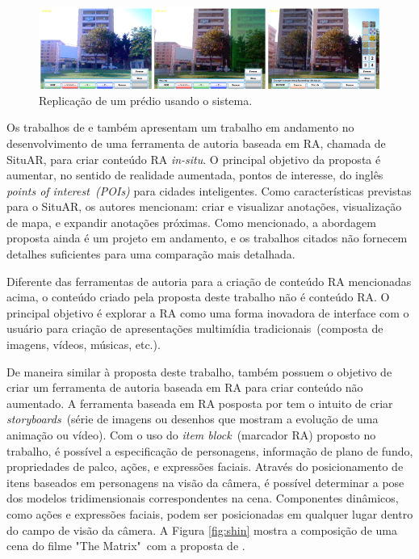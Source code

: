 \documentclass[../main.tex]{subfiles}
\begin{document}
\begin{figure}[!h]
\centering
\includegraphics[width=1\linewidth]{IMG/Relacionados/langlotz.png}
\caption{Replicação de um prédio usando o sistema.}
\label{fig:langlotz}
\end{figure}

Os trabalhos de  e  também apresentam um trabalho em andamento no desenvolvimento de uma ferramenta de autoria baseada em RA, chamada de SituAR, para criar conteúdo RA \emph{in-situ}. O principal objetivo da proposta é aumentar, no sentido de realidade aumentada, pontos de interesse, do inglês \emph{points of interest~(POIs)} para cidades inteligentes. Como características previstas para o SituAR, os autores mencionam: criar e visualizar anotações, visualização de mapa, e expandir anotações próximas. Como mencionado, a abordagem proposta ainda é um projeto em andamento, e os trabalhos citados não fornecem detalhes suficientes para uma comparação mais detalhada.

Diferente das ferramentas de autoria para a criação de conteúdo RA mencionadas acima, o conteúdo criado pela proposta deste trabalho não é conteúdo RA. O principal objetivo é explorar a RA como uma forma inovadora de interface com o usuário para criação de apresentações multimídia tradicionais~(composta de imagens, vídeos, músicas, etc.).

De maneira similar à proposta deste trabalho,  também possuem o objetivo de criar um ferramenta de autoria baseada em RA para criar conteúdo não aumentado. A ferramenta baseada em RA posposta por  tem o intuito de criar \emph{storyboards}~(série de imagens ou desenhos que mostram a evolução de uma animação ou vídeo). Com o uso do \emph{item block}~(marcador RA) proposto no trabalho, é possível a especificação de personagens, informação de plano de fundo, propriedades de palco, ações, e expressões faciais. Através do posicionamento de itens baseados em personagens na visão da câmera, é possível determinar a pose dos modelos tridimensionais correspondentes na cena. Componentes dinâmicos, como ações e expressões faciais, podem ser posicionadas em qualquer lugar dentro do campo de visão da câmera. A Figura \ref{fig:shin} mostra a composição de uma cena do filme "The Matrix"~com a proposta de . 
\end{document}
